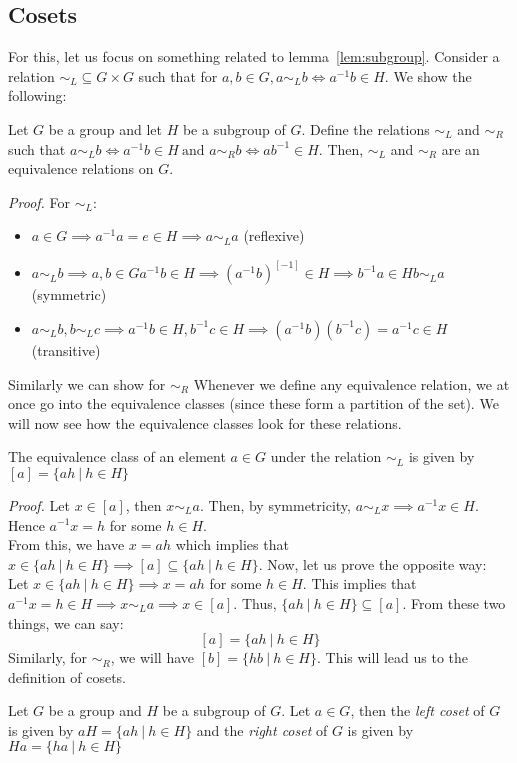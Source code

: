 \subsection{Cosets}
For this, let us focus on something related to lemma~\ref{lem:subgroup}. Consider a relation $\sim_L\subseteq G\times G$ such that for $a,b\in G, a\sim_Lb \iff a^{-1}b\in H$. We show the following:
\begin{proposition}
    Let $G$ be a group and let $H$ be a subgroup of $G$. Define the relations $\sim_L$ and $\sim_R$ such that $a\sim_L b \iff a^{-1}b\in H\ \text{and } a\sim_R b \iff ab^{-1}\in H$. Then, $\sim_L$ and $\sim_R$ are an equivalence relations on $G$. 
\end{proposition}
\textit{Proof.} For $\sim_L$:
\begin{itemize}
    \item $a\in G \implies a^{-1}a = e \in H\implies a\sim_L a$ (reflexive)
    \item $a\sim_Lb\implies a,b \in G a^{-1}b \in H \implies (a^{-1}b)^[-1]\in H \implies b^{-1}a\in H  b\sim_La$ (symmetric)
    \item $a\sim_Lb, b\sim_Lc\implies a^{-1}b\in H, b^{-1}c\in H\implies (a^{-1}b)(b^{-1}c)= a^{-1}c\in H$ (transitive)
\end{itemize}
Similarly we can show for $\sim_R$
Whenever we define any equivalence relation, we at once go into the equivalence classes (since these form a partition of the set). We will now see how the equivalence classes look for these relations.
\begin{lemma}
    The equivalence class of an element $a\in G$ under the relation $\sim_L$ is given by $[a] = \{ah\ |\ h\in H\}$
\end{lemma}
\textit{Proof.} Let $x\in [a]$, then $x\sim_L a$. Then, by symmetricity, $a\sim_L x\implies a^{-1}x\in H$. Hence $a^{-1}x = h$ for some $h\in H$. \\[0.3cm]
From this, we have $x = ah$ which implies that $x\in \{ah \ | \ h\in H\} \implies [a]\subseteq \{ah \ | \ h\in H\}$. Now, let us prove the opposite way:\\[0.3cm]
Let $x\in \{ah \ | \ h\in H\} \implies x = ah$ for some $h\in H$. This implies that $a^{-1}x = h \in H \implies x\sim_L a \implies x\in [a]$. Thus,  $\{ah \ | \ h\in H\} \subseteq [a]$. From these two things, we can say:
$$[a] = \{ah\ |\ h\in H\}$$
Similarly, for $\sim_R$, we will have $[b] = \{hb \ |\ h\in H\}$. This will lead us to the definition of cosets.
\begin{definition}[Cosets]
    Let $G$ be a group and $H$ be a subgroup of $G$. Let $a\in G$, then the \textit{left coset} of $G$ is given by $aH = \{ah \ | \ h\in H\}$ and the \textit{right coset} of $G$ is given by $Ha = \{ha \ | \ h\in H\}$
    
\end{definition}